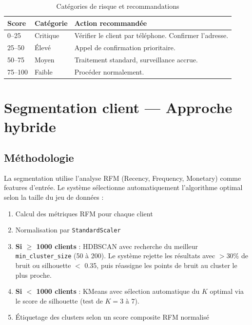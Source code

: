 \documentclass[12pt,a4paper]{report}
\begin{document}
\begin{table}[H]
\centering
\caption{Cat\'{e}gories de risque et recommandations}
\label{tab:risk_categories}
\begin{tabularx}{\textwidth}{l l X}
\toprule
\textbf{Score} & \textbf{Cat\'{e}gorie} & \textbf{Action recommand\'{e}e} \\
\midrule
0--25 & Critique & V\'{e}rifier le client par t\'{e}l\'{e}phone. Confirmer l'adresse. \\
25--50 & \'{E}lev\'{e} & Appel de confirmation prioritaire. \\
50--75 & Moyen & Traitement standard, surveillance accrue. \\
75--100 & Faible & Proc\'{e}der normalement. \\
\bottomrule
\end{tabularx}
\end{table}


\section{Segmentation client — Approche hybride}

\subsection{M\'{e}thodologie}

La segmentation utilise l'analyse RFM (Recency, Frequency, Monetary) comme features d'entr\'{e}e. Le syst\`{e}me s\'{e}lectionne automatiquement l'algorithme optimal selon la taille du jeu de donn\'{e}es :

\begin{enumerate}
  \item Calcul des m\'{e}triques RFM pour chaque client
  \item Normalisation par \texttt{StandardScaler}
  \item \textbf{Si $\geq$ 1000 clients} : HDBSCAN avec recherche du meilleur \texttt{min\_cluster\_size} (50 \`{a} 200). Le syst\`{e}me rejette les r\'{e}sultats avec $>$30\% de bruit ou silhouette $<$ 0.35, puis r\'{e}assigne les points de bruit au cluster le plus proche.
  \item \textbf{Si $<$ 1000 clients} : KMeans avec s\'{e}lection automatique du $K$ optimal via le score de silhouette (test de $K=3$ \`{a} 7).
  \item \'{E}tiquetage des clusters selon un score composite RFM normalis\'{e}
\end{enumerate}
\end{document}
